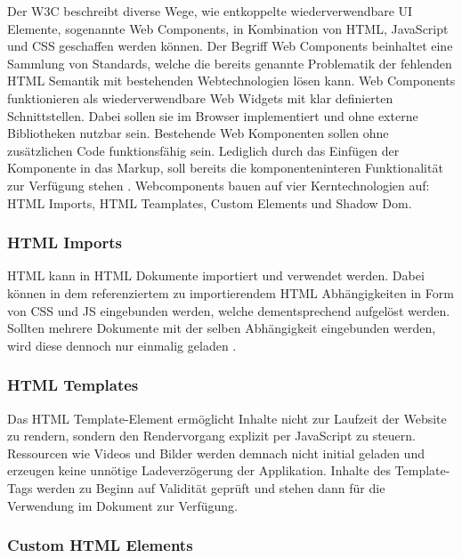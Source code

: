 Der W3C beschreibt diverse Wege, wie entkoppelte wiederverwendbare UI Elemente, sogenannte Web Components,
in Kombination von HTML, JavaScript und CSS geschaffen werden können.
Der Begriff Web Components beinhaltet eine Sammlung von Standards,
welche die bereits genannte Problematik der fehlenden HTML Semantik mit bestehenden Webtechnologien lösen kann.
Web Components funktionieren als wiederverwendbare Web Widgets mit klar definierten Schnittstellen.
Dabei sollen sie im Browser implementiert und ohne externe Bibliotheken nutzbar sein.
Bestehende Web Komponenten sollen ohne zusätzlichen Code funktionsfähig sein. Lediglich durch das Einfügen der Komponente
in das Markup, soll bereits die komponenteninteren Funktionalität zur Verfügung stehen
\cite[42]{Web-Component-Architecture}.
Webcomponents bauen auf vier Kerntechnologien auf: HTML Imports, HTML Teamplates, Custom Elements und Shadow Dom.

\subsubsection{HTML Imports}
HTML kann in HTML Dokumente importiert und verwendet werden.
Dabei können in dem referenziertem zu importierendem HTML Abhängigkeiten in Form von CSS und JS eingebunden werden,
welche dementsprechend aufgelöst werden.
Sollten mehrere Dokumente mit der selben Abhängigkeit eingebunden werden, wird diese dennoch nur einmalig geladen
\cite{HTMLI44:online}.

\vspace{1cm}

\vspace{1cm}

\subsubsection{HTML Templates}

Das HTML Template-Element ermöglicht Inhalte nicht zur Laufzeit der Website zu rendern,
sondern den Rendervorgang explizit per JavaScript zu steuern. Ressourcen wie Videos und Bilder werden demnach
nicht initial geladen und erzeugen keine unnötige Ladeverzögerung der Applikation.
Inhalte des Template-Tags werden zu Beginn auf Validität geprüft und stehen dann für die Verwendung im Dokument
zur Verfügung.

\subsubsection{Custom HTML Elements}

